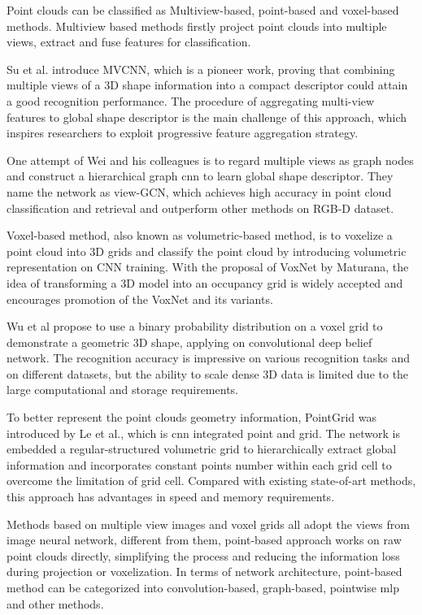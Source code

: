 Point clouds can be classified as Multiview-based, point-based and voxel-based methods. Multiview based methods firstly project point clouds into multiple views, extract and fuse features for classification. 

Su et al.\cite{su_multi-view_2015} introduce MVCNN, which is a pioneer work, proving that combining multiple views of a 3D shape information into a compact descriptor could attain a good recognition performance. The procedure of aggregating multi-view features to global shape descriptor is the main challenge of this approach, which inspires researchers to exploit progressive feature aggregation strategy. 

One attempt of Wei and his colleagues \cite{wei_view-gcn_2020} is to regard multiple views as graph nodes and construct a hierarchical graph \acrshort{cnn} to learn global shape descriptor. They name the network as view-GCN, which achieves high accuracy in point cloud classification and retrieval and outperform other methods on RGB-D dataset\cite{lai_large-scale_nodate}.

Voxel-based method, also known as volumetric-based method, is to voxelize a point cloud into 3D grids and classify the point cloud by introducing volumetric representation on CNN training. With the proposal of VoxNet\cite{maturana_voxnet_2015} by Maturana, the idea of transforming a 3D model into an occupancy grid is widely accepted and encourages promotion of the VoxNet and its variants. 

Wu et al\cite{wu_3d_2015} propose to use a binary probability distribution on a voxel grid to demonstrate a geometric 3D shape, applying on convolutional deep belief network. The recognition accuracy is impressive on various recognition tasks and on different datasets, but the ability to scale dense 3D data is limited due to the large computational and storage requirements. 

To better represent the point clouds geometry information, PointGrid was introduced by Le et al.\cite{le_pointgrid_2018}, which is \acrshort{cnn} integrated point and grid. The network is embedded a regular-structured volumetric grid to hierarchically extract global information and incorporates constant points number within each grid cell to overcome the limitation of grid cell. Compared with existing state-of-art methods, this approach has advantages in speed and memory requirements.
  
Methods based on multiple view images and voxel grids all adopt the views from image neural network, different from them, point-based approach works on raw point clouds directly, simplifying the process and reducing the information loss during projection or voxelization. In terms of network architecture, point-based method can be categorized into convolution-based, graph-based, pointwise \acrshort{mlp} and other methods. 

